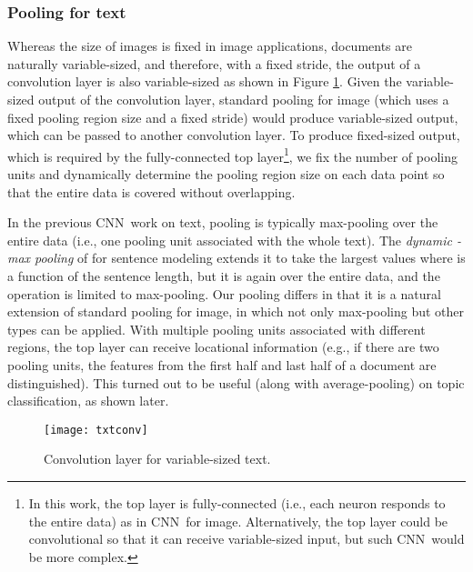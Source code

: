 \documentclass[11pt,letterpaper]{article}
\newcommand{\cnn}{CNN}
\begin{document}
\subsubsection{Pooling for text}
Whereas the size of images is fixed in image applications, 
documents are naturally variable-sized, 
and therefore, with a fixed stride, the output of a convolution layer is also variable-sized 
as shown in Figure \ref{fig:txtconv}.  
Given the variable-sized output of the convolution layer, 
standard pooling for image (which uses a fixed pooling region size and a fixed stride) 
would produce variable-sized output, 
which can be passed to another convolution layer.   
To produce fixed-sized output, 
which is required by the fully-connected top layer\footnote{
  In this work, the top layer is fully-connected (i.e., each neuron responds to the entire data) 
  as in \cnn\ for image.  
  Alternatively, the top layer could be convolutional so that it can receive variable-sized input, 
  but such \cnn\ would be more complex.   
}, 
we fix the number of pooling units and dynamically
determine the pooling region size on each data point
so that the entire data is covered without overlapping.  


In the previous \cnn\ work on text, pooling is typically max-pooling 
over the entire data (i.e., one pooling unit associated with the whole text).  
The {\em dynamic -max pooling} of \cite{KGB14} for sentence modeling extends it 
to take the  largest values where  is a function of the sentence length, 
but it is again over the entire data, and the operation is limited to max-pooling.  
Our pooling differs in that it is a natural extension of standard pooling for image, 
in which not only max-pooling but other types can be applied.  
With multiple pooling units associated with 
different regions, the top layer can receive locational 
information (e.g., if there are two pooling units, 
the features from the first half and last half of a document are distinguished).  
This turned out to be useful (along with average-pooling) 
on topic classification, as shown later.  



\begin{figure}
\centering
\texttt{[image: txtconv]}
\vspace{-0.15in}
\caption{\label{fig:txtconv} \footnotesize Convolution layer for variable-sized text.  
}
\end{figure}
\end{document}
